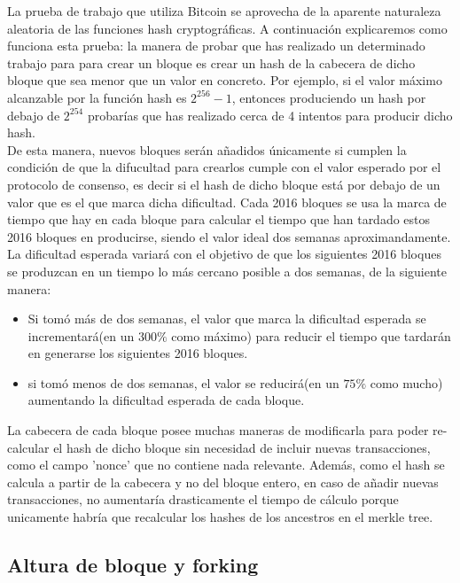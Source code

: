 \documentclass[11pt,a4paper]{article}
\begin{document}
La prueba de trabajo que utiliza Bitcoin se aprovecha de la aparente naturaleza aleatoria de las funciones hash cryptográficas. A continuación explicaremos como funciona esta prueba: la manera de probar que has realizado un determinado trabajo para para crear un bloque es crear un hash de la cabecera de dicho bloque que sea menor que un valor en concreto. Por ejemplo, si el valor máximo alcanzable por la función hash es $2^{256}-1$, entonces produciendo un hash por debajo de $2^{254}$ probarías que has realizado cerca de 4 intentos para producir dicho hash.\\

De esta manera, nuevos bloques serán añadidos únicamente si cumplen la condición de que la difucultad para crearlos cumple con el valor esperado por el protocolo de consenso, es decir si el hash de dicho bloque está por debajo de un valor que es el que marca dicha dificultad. Cada 2016 bloques se usa la marca de tiempo que hay en cada bloque para calcular el tiempo que han tardado estos 2016 bloques en producirse, siendo el valor ideal dos semanas aproximandamente. La dificultad esperada variará con el objetivo de que los siguientes 2016 bloques se produzcan en un tiempo lo más cercano posible a dos semanas, de la siguiente manera:
\begin{itemize}
	\item Si tomó más de dos semanas, el valor que marca la dificultad esperada se incrementará(en un $300\%$ como máximo) para reducir el tiempo que tardarán en generarse los siguientes 2016 bloques.
	\item si tomó menos de dos semanas, el valor se reducirá(en un $75\%$ como mucho) aumentando la dificultad esperada de cada bloque.
	
\end{itemize}

La cabecera de cada bloque posee muchas maneras de modificarla para poder re-calcular el hash de dicho bloque sin necesidad de incluir nuevas transacciones, como el campo 'nonce' que no contiene nada relevante. Además, como el hash se calcula a partir de la cabecera y no del bloque entero, en caso de añadir nuevas transacciones, no aumentaría drasticamente el tiempo de cálculo porque unicamente habría que recalcular los hashes de los ancestros en el merkle tree.

\subsection{Altura de bloque y forking}
\end{document}
